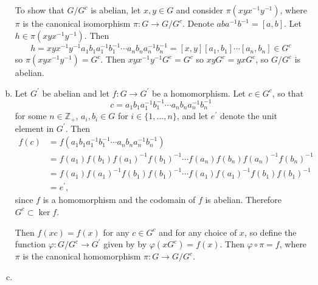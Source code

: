 \documentclass{article}
\begin{document}
\begin{Answer}
\begin{enumerate}[(a)]
{        To show that $G / G^c$ is abelian, let $x, y \in G$ and
        consider $\pi(x y x^{-1} y^{-1})$, where $\pi$ is the
        canonical isomorphism $\pi : G \to G / G^c$.
        Denote
        $a b a^{-1} b^{-1} = [a, b]$. Let $h \in \pi(x y x^{-1} y^{-1})$. Then
        $$
        h = x y x^{-1} y^{-1} 
            a_1 b_1 a_1^{-1} b_1^{-1}
            \cdots
            a_n b_n a_n^{-1} b_n^{-1}
          = [x, y] [a_1, b_1] \cdots [a_n, b_n] \in G^c
        $$
        so $\pi(x y x^{-1} y^{-1}) = G^c$. Then 
        $x y x^{-1} y^{-1} G^c = G^c$ so $x y G^c = y x G^c$, so
        $G / G^c$ is abelian.
       }
  \item{Let $G^\prime$ be abelian and let $f : G \to G^\prime$ be a
        homomorphism. Let $c \in G^c$, so that
        $$
        c = a_1 b_1 a_1^{-1} b_1^{-1} \cdots a_n b_n a_n^{-1} b_n^{-1}
        $$
        for some $n \in \mathbb{Z}_+$, $a_i, b_i \in G$ for 
        $i \in \{1, \dots, n\}$, and let $e^\prime$ denote the unit
        element in $G^\prime$. Then
        \begin{align*}
        f(c) &= f(a_1 b_1 a_1^{-1} b_1^{-1}
                  \cdots
                  a_n b_n a_n^{-1}b_n^{-1}) \\
             &= f(a_1)f(b_1)f(a_1)^{-1}f(b_1)^{-1} 
                \cdots
                f(a_n)f(b_n)f(a_n)^{-1}f(b_n)^{-1} \\
             &= f(a_1)f(a_1)^{-1}f(b_1)f(b_1)^{-1}
                \cdots
                f(a_1)f(a_1)^{-1}f(b_1)f(b_1)^{-1} \\
             &= e^\prime,
        \end{align*}
        since $f$ is a homomorphism and the codomain of $f$ is
        abelian. Therefore $G^c \subset \ker f$. 
%        

        Then $f(xc) = f(x)$ for any $c \in G^c$ and for any choice of $x$, so define
        the function $\varphi : G / G^c \to G^\prime$ given by
        by $\varphi(xG^c) = f(x)$. Then $\varphi \circ \pi = f$,
        where $\pi$ is the canonical homomorphism
        $\pi : G \to G/G^c$.
       }
  \item{
       }
\end{enumerate}
\end{Answer}

\pagebreak
\end{document}
